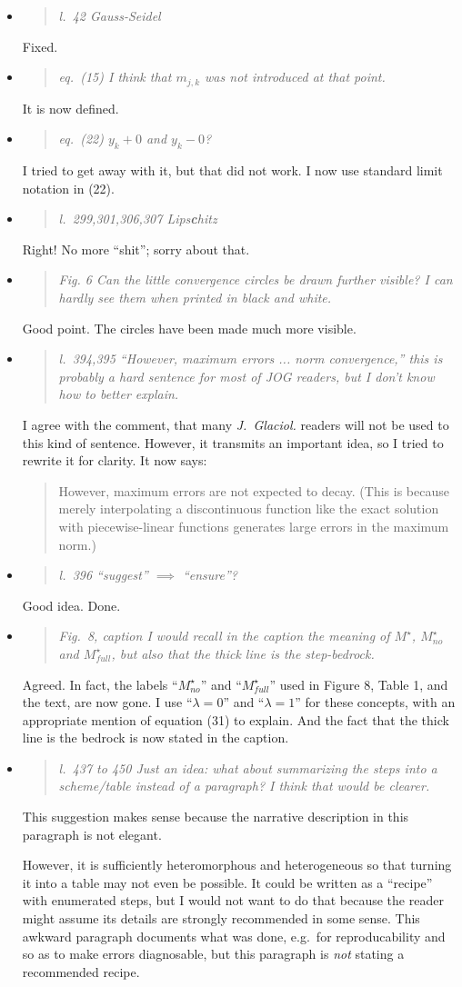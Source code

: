 \documentclass[11pt,reqno]{amsart}
\newcommand{\reply}[2]{
\medskip\medskip
\item  \begin{quote}
\emph{#1}
\end{quote}

\medskip
\noindent #2}
\begin{document}
\begin{itemize}
\reply{l.~42 Gauss-Seidel}
{Fixed.}

\reply{eq.~(15) I think that $m_{j,k}$ was not introduced at that point.}
{It is now defined.}

\reply{eq.~(22) $y_{k} + 0$ and $y_k − 0$?}
{I tried to get away with it, but that did not work.  I now use standard limit notation in (22).}

\reply{l.~299,301,306,307 Lips\textbf{c}hitz}
{Right!  No more ``shit''; sorry about that.}

\reply{Fig. 6 Can the little convergence circles be drawn further visible? I can hardly see them
when printed in black and white.}
{Good point.  The circles have been made much more visible.}

\reply{l.~394,395 ``However, maximum errors ... norm convergence,'' this is probably a hard sentence for most of JOG readers, but I don't know how to better explain.}
{I agree with the comment, that many \emph{J.~Glaciol.} readers will not be used to this kind of sentence.  However, it transmits an important idea, so I tried to rewrite it for clarity.  It now says:
\begin{quote}
However, maximum errors are not expected to decay.  (This is because merely interpolating a discontinuous function like the exact solution with piecewise-linear functions generates large errors in the maximum norm.)
\end{quote}}

\reply{l.~396 ``suggest'' $\implies$ ``ensure''?}
{Good idea.  Done.}

\reply{Fig.~8, caption I would recall in the caption the meaning of $M^\star$, $M_{no}^\star$ and $M_{full}^\star$, but also that the thick line is the step-bedrock.}
{Agreed.  In fact, the labels ``$M_{no}^\star$'' and ``$M_{full}^\star$'' used in Figure 8, Table 1, and the text, are now gone.  I use ``$\lambda=0$'' and ``$\lambda=1$'' for these concepts, with an appropriate mention of equation (31) to explain.  And the fact that the thick line is the bedrock is now stated in the caption.}

\reply{l.~437 to 450 Just an idea: what about summarizing the steps into a scheme/table instead of
a paragraph? I think that would be clearer.}
{This suggestion makes sense because the narrative description in this paragraph is not elegant.

However, it is sufficiently heteromorphous and heterogeneous so that turning it into a table may not even be possible.  It could be written as a ``recipe'' with enumerated steps, but I would not want to do that because the reader might assume its details are strongly recommended in some sense.  This awkward paragraph documents what was done, e.g.~for reproducability and so as to make errors diagnosable, but this paragraph is \emph{not} stating a recommended recipe.}
\end{itemize}
\end{document}
